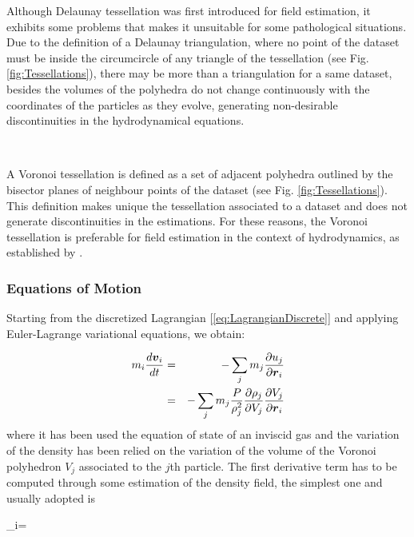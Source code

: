 \documentclass[a4,useAMS,usenatbib,usegraphicx,12pt]{article}
\begin{document}
Although Delaunay tessellation was first introduced for field estimation, it 
exhibits some problems that makes it unsuitable for some pathological 
situations. Due to the definition of a Delaunay triangulation, where no point 
of the dataset must be inside the circumcircle of any triangle of the 
tessellation (see Fig. \ref{fig:Tessellations}), there may be more than a 
triangulation for a same dataset, besides the volumes of the polyhedra do not 
change continuously with the coordinates of the particles as they evolve, 
generating non-desirable discontinuities in the hydrodynamical equations.

\

A Voronoi tessellation is defined as a set of adjacent polyhedra outlined by
the bisector planes of neighbour points of the dataset (see Fig. 
\ref{fig:Tessellations}). This definition makes unique the tessellation 
associated to a dataset and does not generate discontinuities in the 
estimations. For these reasons, the Voronoi tessellation is preferable for 
field estimation in the context of hydrodynamics, as established by 
\citet{Hess10}.


\subsubsection*{Equations of Motion}

Starting from the discretized Lagrangian [\ref{eq:LagrangianDiscrete}] and 
applying Euler-Lagrange variational equations, we obtain:

\begin{eqnarray}
\nonumber{}
m_i \frac{d \boldsymbol{ v }_i}{dt} &=& - \sum_j m_j \frac{\partial u_j}{\partial \boldsymbol{ r }_i} \\
\label{eq:VPHLarangian}
&=& -\sum_j m_j \frac{P}{\rho_j^2}\frac{\partial \rho_j}{\partial V_j}\frac{\partial V_j}{\partial \boldsymbol{ r }_i}
\end{eqnarray}
where it has been used the equation of state of an inviscid gas and the variation
of the density has been relied on the variation of the volume of the Voronoi 
polyhedron $V_j$ associated to the $j$th particle. The first derivative term has 
to be computed through some estimation of the density field, the simplest one and 
usually adopted is 

{ \rho_i=  }
\end{document}

